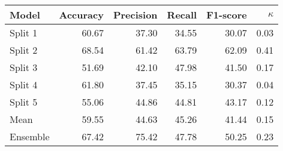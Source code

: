 \begin{tabular}{lrrrrr}
    \toprule
    Model & Accuracy & Precision & Recall & F1-score & $\kappa$ \\
    \midrule
    Split 1 & 60.67 & 37.30 & 34.55 & 30.07 & 0.03 \\
    Split 2 & 68.54 & 61.42 & 63.79 & 62.09 & 0.41 \\
    Split 3 & 51.69 & 42.10 & 47.98 & 41.50 & 0.17 \\
    Split 4 & 61.80 & 37.45 & 35.15 & 30.37 & 0.04 \\ 
    Split 5 & 55.06 & 44.86 & 44.81 & 43.17 & 0.12 \\
    \midrule
    Mean & 59.55 & 44.63 & 45.26 & 41.44 & 0.15 \\
    Ensemble & 67.42 & 75.42 & 47.78 & 50.25 & 0.23 \\
    \bottomrule
\end{tabular}
